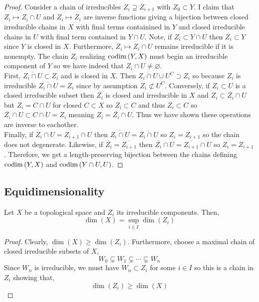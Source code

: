 \documentclass[12pt]{article}
\begin{document}
\begin{proof}
Consider a chain of irreducibles $Z_i \supsetneq Z_{i+1}$ with $Z_0 \subset Y$. I claim that $Z_i \mapsto Z_i \cap U$ and $Z_i \mapsto \overline{Z_i}$ are inverse functions giving a bijection between closed irreducible chains in $X$ with final terms containined in $Y$ and closed irreducible chains in $U$ with final term contained in $Y \cap  U$. Note, if $Z_i \subset Y \cap U$ then $\overline{Z_i} \subset Y$ since $Y$ is closed in $X$. Furthermore, $Z_i \mapsto Z_i \cap U$ remains irreducible if it is nonempty. The chain $Z_i$ realizing $\mathrm{codim}\left( Y, X \right)$ must begin an irreducible component of $Y$ so we have indeed that $Z_i \cap U \neq \varnothing$.
\bigskip\\
First, $\overline{Z_i \cap U} \subset Z_i$ and is closed in $X$. Then $\overline{Z_i \cap U} \cup U^C \supset Z_i$ so because $Z_i$ is irreducible $\overline{Z_i \cap U} = Z_i$ since by assumption $Z_i \not\subset U^C$. Conversely, if $Z_i \subset U$ is a closed irreducible subset then $\overline{Z_i}$ is closed and irreducible in $X$ and $Z_i \subset \overline{Z_i} \cap U$ but $Z_i = C \cap U$ for closed $C \subset X$ so $Z_i \subset C$ and thus $\overline{Z_i} \subset C$ so $\overline{Z_i} \cap U \subset C \cap U = Z_i$ meaning $Z_i = \overline{Z_i} \cap U$. Thus we have shown these operations are inverse to eachother.
\bigskip\\
Finally, if $Z_i \cap U = Z_{i+1} \cap U$ then $\overline{Z_i \cap U} = \overline{Z_i \cap U}$ so $Z_i = Z_{i+1}$ so the chain does not degenerate. Likewise, if $\overline{Z_i} = \overline{Z_{i+1}}$ then $\overline{Z_i} \cap U = \overline{Z_{i+1}} \cap U$ so $Z_i = Z_{i+1}$. Therefore, we get a length-preserving bijection between the chains defining $\mathrm{codim}\left( Y,X \right)$ and $\mathrm{codim}\left( Y \cap U, U \right)$. 
\end{proof}


\subsection{Equidimensionality}

\begin{prop}
Let $X$ be a topological space and $Z_i$ its irreducible components. Then,
\[ \dim{(X)} = \sup_{i \in I} \dim{(Z_i)} \]
\end{prop}

\begin{proof}
Clearly, $\dim{(X)} \ge \dim{(Z_i)}$. Furthermore, choose a maximal chain of closed irreducible subsets of $X$,
\[  W_0 \subsetneq W_1 \subsetneq \cdots \subsetneq W_n \]
Since $W_n$ is irreducible, we must have $W_n \subset Z_i$ for some $i \in I$ so this is a chain in $Z_i$ showing that,
\[ \dim{(Z_i)} \ge \dim{(X)} \]
\end{proof}
\end{document}
